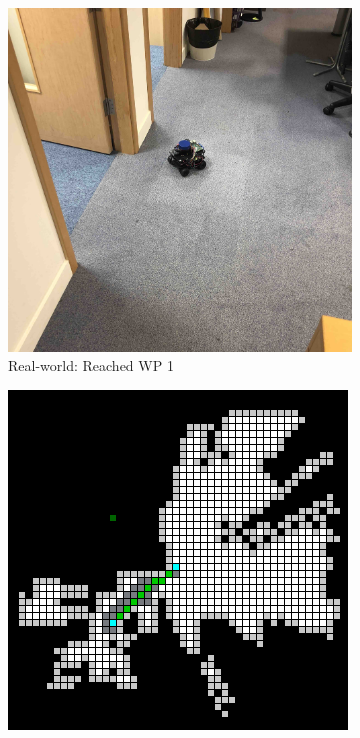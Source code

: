 \begin{figure}[h!]
  \begin{subfigure}[b]{0.32\linewidth}
    \includegraphics[width=\linewidth]{images/real/robo/2.JPG}
     \caption{Real-world: Reached WP 1}
  \end{subfigure}
  \hfill
  \begin{subfigure}[b]{0.32\linewidth}
    \includegraphics[width=\linewidth]{images/real/sys/2_2.png}

\end{subfigure}
\end{figure}
